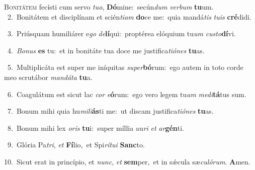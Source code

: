 \lettrine{\initial\textcolor{\initialcolor}{B}}{onitátem} fecísti cum servo \textit{tu}\-\textit{o}, \textbf{Dó}\-mine:~\star secún\textit{dum} \textit{ver}\-\textit{bum} \textbf{tu}\-um.\\
{\numbfont\textcolor{\numbcolor}{~2.}}~Bonitátem et disciplínam et scién\-\textit{ti}\-\textit{am} \textbf{do}\-ce me:~\star quia mandá\textit{tis} \textit{tu}\-\textit{is} \textbf{cré}\-didi.\par
{\numbfont\textcolor{\numbcolor}{~3.}}~Priúsquam humiliárer e\textit{go} \textit{de}\-\textbf{lí}qui:~\star proptérea elóquium tu\textit{um} \textit{cus}\-\textit{to}\textbf{dí}vi.\par
{\numbfont\textcolor{\numbcolor}{~4.}}~\-\textit{Bo}\-\textit{nus} \textbf{es} tu:~\star et in bonitáte tua doce me justifica\-\textit{ti}\-\textit{ó}\textit{nes} \textbf{tu}\-as.\par
{\numbfont\textcolor{\numbcolor}{~5.}}~Multiplicáta est super me iníquitas \textit{su}\-\textit{per}\textbf{bó}rum:~\star ego autem in toto corde meo scrutábor \textit{man}\-\textit{dá}\textit{ta} \textbf{tu}\-a.\par
{\numbfont\textcolor{\numbcolor}{~6.}}~Coagulátum est sicut lac \textit{cor} \textit{e}\-\textbf{ó}rum:~\star ego vero legem tu\textit{am} \textit{me}\-\textit{di}\textbf{tá}tus sum.\par
{\numbfont\textcolor{\numbcolor}{~7.}}~Bonum mihi quia hu\-\textit{mi}\-\textit{li}\textbf{ás}ti me:~\star ut discam justifica\-\textit{ti}\-\textit{ó}\textit{nes} \textbf{tu}\-as.\par
{\numbfont\textcolor{\numbcolor}{~8.}}~Bonum mihi lex \textit{o}\-\textit{ris} \textbf{tu}\-i:~\star super míllia au\textit{ri} \textit{et} \textit{ar}\-\textbf{gén}ti.\par
{\numbfont\textcolor{\numbcolor}{~9.}}~Glória Pa\-\textit{tri}\-, \textit{et} \textbf{Fí}\-lio,~\star et Spi\-\textit{rí}\-\textit{tu}\textit{i} \textbf{Sanc}\-to.\par
{\numbfont\textcolor{\numbcolor}{10.}}~Sicut erat in princípio, et \textit{nunc}\-, \textit{et} \textbf{sem}\-per,~\star et in sǽcula sæ\-\textit{cu}\-\textit{ló}\textit{rum}. \textbf{A}\-men.\par
